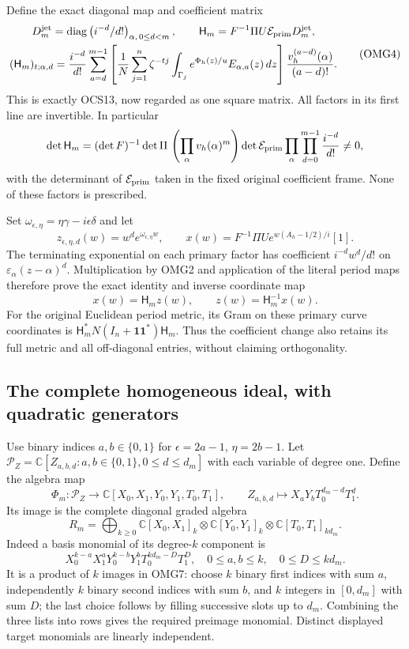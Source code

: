 \documentclass[11pt,a4paper]{article}
\begin{document}
Define the exact diagonal map and coefficient matrix
\[
\begin{gathered}
 D_m^{\rm jet}=\operatorname{diag}\left(i^{-d}/d!\right)_{\alpha,\,0\le d<m},
 \qquad \mathsf H_m=F^{-1}\Pi U\mathcal E_{\rm prim}D_m^{\rm jet},\\
 (\mathsf H_m)_{t;\alpha,d}
  =\frac{i^{-d}}{d!}\sum_{a=d}^{m-1}
     \left[\frac1N\sum_{j=1}^{n}\zeta^{-tj}
              \int_{\Gamma_j}e^{\Phi_h(z)/u}E_{\alpha,a}(z)\,dz\right]
                  \frac{v_h^{(a-d)}(\alpha)}{(a-d)!}.
\end{gathered}\tag{OMG4}
\]
This is exactly OCS13, now regarded as one square matrix. All
factors in its first line are invertible. In particular
\[
 \det\mathsf H_m=(\det F)^{-1}\det\Pi\,
      \left(\prod_\alpha v_h(\alpha)^m\right)
      \det\mathcal E_{\rm prim}
      \prod_\alpha\prod_{d=0}^{m-1}\frac{i^{-d}}{d!}\ne0,
\]
with the determinant of $\mathcal E_{\rm prim}$ taken in the fixed
original coefficient frame. None of these factors is prescribed.

Set $\omega_{\epsilon,\eta}=\eta\gamma-i\epsilon\delta$ and let
\[
 z_{\epsilon,\eta,d}(w)=w^d e^{\omega_{\epsilon,\eta}w},\qquad
 x(w)=F^{-1}\Pi Ue^{w(A_h-1/2)/i}[1].
 \tag{OMG5}
\]
The terminating exponential on each primary factor has coefficient
$i^{-d}w^d/d!$ on $\varepsilon_\alpha(z-\alpha)^d$.
Multiplication by OMG2 and application of the literal period maps
therefore prove the exact identity and inverse coordinate map
\[
 \boxed{x(w)=\mathsf H_m z(w),\qquad z(w)=\mathsf H_m^{-1}x(w).}
 \tag{OMG6}
\]
For the original Euclidean period metric, its Gram on these primary
curve coordinates is $\mathsf H_m^*N(I_n+\mathbf1\mathbf1^*)
\mathsf H_m$. Thus the coefficient change also retains its full
metric and all off-diagonal entries, without claiming orthogonality.

\subsection{The complete homogeneous ideal, with quadratic generators}
Use binary indices $a,b\in\{0,1\}$ for
$\epsilon=2a-1$, $\eta=2b-1$. Let
$\mathscr P_Z=\mathbb C[Z_{a,b,d}:a,b\in\{0,1\},0\le d\le d_m]$
with each variable of degree one. Define the algebra map
\[
 \Phi_m:\mathscr P_Z\longrightarrow
        \mathbb C[X_0,X_1,Y_0,Y_1,T_0,T_1],\qquad
 Z_{a,b,d}\longmapsto X_aY_bT_0^{d_m-d}T_1^d.
 \tag{OMG7}
\]
Its image is the complete diagonal graded algebra
\[
 R_m=\bigoplus_{k\ge0}
  \mathbb C[X_0,X_1]_k\otimes\mathbb C[Y_0,Y_1]_k
                              \otimes\mathbb C[T_0,T_1]_{kd_m}.
 \tag{OMG8}
\]
Indeed a basis monomial of its degree-$k$ component is
\[
 X_0^{k-a}X_1^aY_0^{k-b}Y_1^bT_0^{kd_m-D}T_1^D,
       \quad0\le a,b\le k,\quad0\le D\le kd_m.
 \tag{OMG9}
\]
It is a product of $k$ images in OMG7: choose $k$ binary first
indices with sum $a$, independently $k$ binary second indices with
sum $b$, and $k$ integers in $[0,d_m]$ with sum $D$; the last
choice follows by filling successive slots up to $d_m$. Combining
the three lists into rows gives the required preimage monomial.
Distinct displayed target monomials are linearly independent.
\end{document}
